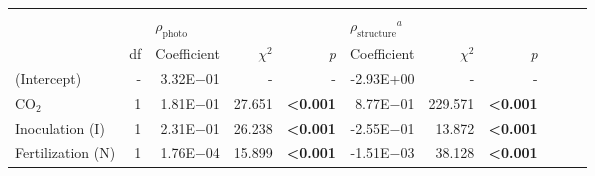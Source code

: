 \begin{landscape}
\begin{table}
{\begin{tabular}{p{3cm}p{0.5cm}p{1.75cm}p{1.5cm}p{1.5cm}p{1.75cm}p{1.5cm}p{1.5cm}p{1.75cm}p{1.5cm}p{1.5cm}}
            &&&&&&&&&&
            \\

            &&  \multicolumn{3}{l}{$\rho_\mathrm{photo}$} 
            &   \multicolumn{3}{l}{$\rho_\mathrm{structure}{}^a$} 
            &&& \\
            \hline
            & \multicolumn{1}{r}{df}
            & \multicolumn{1}{r}{Coefficient}   & \multicolumn{1}{r}{$\chi^{2}$}    & \multicolumn{1}{r}{\textit{p}} 
            & \multicolumn{1}{r}{Coefficient}   & \multicolumn{1}{r}{$\chi^{2}$}    & \multicolumn{1}{r}{\textit{p}} 
            \\
            \hline

            (Intercept) & \multicolumn{1}{r}{-}
            & \multicolumn{1}{r}{3.32E$-$01}      & \multicolumn{1}{r}{-}             & \multicolumn{1}{r}{-}
            & \multicolumn{1}{r}{-2.93E+00}     & \multicolumn{1}{r}{-}             & \multicolumn{1}{r}{-}
            & \multicolumn{1}{r}{}              & \multicolumn{1}{r}{}              & \multicolumn{1}{r}{}
            \\

            CO$_2$ & \multicolumn{1}{r}{1}
            & \multicolumn{1}{r}{1.81E$-$01}      & \multicolumn{1}{r}{27.651}        & \multicolumn{1}{r}{\textbf{<0.001}}
            & \multicolumn{1}{r}{8.77E$-$01}      & \multicolumn{1}{r}{229.571}       & \multicolumn{1}{r}{\textbf{<0.001}}
            & \multicolumn{1}{r}{}              & \multicolumn{1}{r}{}              & \multicolumn{1}{r}{} 
            \\

            Inoculation (I) & \multicolumn{1}{r}{1}
            & \multicolumn{1}{r}{2.31E$-$01}      & \multicolumn{1}{r}{26.238}        & \multicolumn{1}{r}{\textbf{<0.001}}
            & \multicolumn{1}{r}{-2.55E$-$01}     & \multicolumn{1}{r}{13.872}        & \multicolumn{1}{r}{\textbf{<0.001}}
            & \multicolumn{1}{r}{}              & \multicolumn{1}{r}{}              & \multicolumn{1}{r}{} 
            \\

            Fertilization (N) & \multicolumn{1}{r}{1}
            & \multicolumn{1}{r}{1.76E$-$04}      & \multicolumn{1}{r}{15.899}        & \multicolumn{1}{r}{\textbf{<0.001}}
            & \multicolumn{1}{r}{-1.51E$-$03}     & \multicolumn{1}{r}{38.128}        & \multicolumn{1}{r}{\textbf{<0.001}}
            & \multicolumn{1}{r}{}              & \multicolumn{1}{r}{}              & \multicolumn{1}{r}{} 
            \\


\end{tabular}}
\end{table}
\end{landscape}
